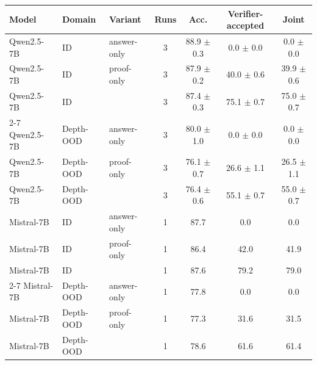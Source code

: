 \begin{tabular}{lllcccc}
\toprule
Model & Domain & Variant & Runs & Acc. & Verifier-accepted & Joint \\
\midrule
Qwen2.5-7B & ID & answer-only & 3 & 88.9 $\pm$ 0.3 & 0.0 $\pm$ 0.0 & 0.0 $\pm$ 0.0 \\
Qwen2.5-7B & ID & proof-only & 3 & 87.9 $\pm$ 0.2 & 40.0 $\pm$ 0.6 & 39.9 $\pm$ 0.6 \\
Qwen2.5-7B & ID & \model{} & 3 & 87.4 $\pm$ 0.3 & 75.1 $\pm$ 0.7 & 75.0 $\pm$ 0.7 \\
\cmidrule(lr){2-7}
Qwen2.5-7B & Depth-OOD & answer-only & 3 & 80.0 $\pm$ 1.0 & 0.0 $\pm$ 0.0 & 0.0 $\pm$ 0.0 \\
Qwen2.5-7B & Depth-OOD & proof-only & 3 & 76.1 $\pm$ 0.7 & 26.6 $\pm$ 1.1 & 26.5 $\pm$ 1.1 \\
Qwen2.5-7B & Depth-OOD & \model{} & 3 & 76.4 $\pm$ 0.6 & 55.1 $\pm$ 0.7 & 55.0 $\pm$ 0.7 \\
\midrule
Mistral-7B & ID & answer-only & 1 & 87.7 & 0.0 & 0.0 \\
Mistral-7B & ID & proof-only & 1 & 86.4 & 42.0 & 41.9 \\
Mistral-7B & ID & \model{} & 1 & 87.6 & 79.2 & 79.0 \\
\cmidrule(lr){2-7}
Mistral-7B & Depth-OOD & answer-only & 1 & 77.8 & 0.0 & 0.0 \\
Mistral-7B & Depth-OOD & proof-only & 1 & 77.3 & 31.6 & 31.5 \\
Mistral-7B & Depth-OOD & \model{} & 1 & 78.6 & 61.6 & 61.4 \\
\bottomrule
\end{tabular}
